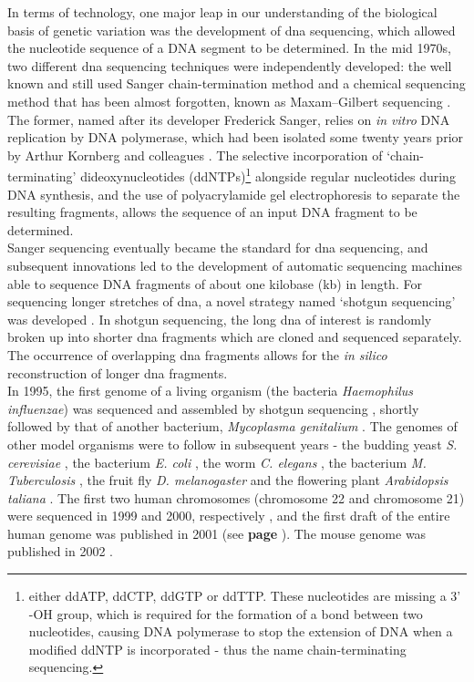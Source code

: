 In terms of technology, one major leap in our understanding of the biological basis of genetic variation was the development of \gls{dna} sequencing, which allowed the nucleotide sequence of a DNA segment to be determined.
In the mid 1970s, two different \gls{dna} sequencing techniques were independently developed: the well known and still used Sanger chain-termination method \cite{sanger1975rapid, sanger1977dna} and a chemical sequencing method that has been almost forgotten, known as Maxam–Gilbert sequencing \cite{maxam1977new}.
The former, named after its developer Frederick Sanger, relies on \textit{in vitro} DNA replication by DNA polymerase, which had been isolated some twenty years prior by Arthur Kornberg and colleagues \cite{kornberg1956enzymic}.
The selective incorporation of `chain-terminating' dideoxynucleotides (ddNTPs)\footnote{either ddATP, ddCTP, ddGTP or ddTTP.
These nucleotides are missing a 3' -OH group, which is required for the formation of a bond between two nucleotides, causing DNA polymerase to stop the extension of DNA when a modified ddNTP is incorporated - thus the name chain-terminating sequencing.} alongside regular nucleotides during DNA synthesis, and the use of polyacrylamide gel electrophoresis to separate the resulting fragments, allows the sequence of an input DNA fragment to be determined. \\

Sanger sequencing eventually became the standard for \gls{dna} sequencing, and subsequent innovations led to the development of automatic sequencing machines able to sequence DNA fragments of about one kilobase (kb) in length. 
For sequencing longer stretches of \gls{dna}, a novel strategy named `shotgun sequencing' was developed \cite{staden1979strategy, anderson1981shotgun}. 
In shotgun sequencing, the long \gls{dna} of interest is randomly broken up into shorter \gls{dna} fragments which are cloned and sequenced separately. 
The occurrence of overlapping \gls{dna} fragments allows for the \textit{in silico} reconstruction of longer \gls{dna} fragments. \\

In 1995, the first genome of a living organism (the bacteria \textit{Haemophilus influenzae}) was sequenced and assembled by shotgun sequencing \cite{fleischmann1995whole}, shortly followed by that of another bacterium, \textit{Mycoplasma genitalium} \cite{fraser1995minimal}. 
The genomes of other model organisms were to follow in subsequent years - the budding yeast \textit{S. cerevisiae} \cite{goffeau1996life}, the bacterium \textit{E. coli} \cite{blattner1997complete}, the worm \textit{C. elegans} \cite{c1998genome}, the bacterium \textit{M. Tuberculosis} \cite{cole1998deciphering}, the fruit fly \textit{D. melanogaster} \cite{adams2000genome} and the flowering plant \textit{Arabidopsis taliana} \cite{kaul2000analysis}.
The first two human chromosomes (chromosome 22 and chromosome 21) were sequenced in 1999 and 2000, respectively \cite{dunham1999dna, hattori2000dna}, and the first draft of the entire human genome was published in 2001 \cite{lander2001initial, venter2001sequence} (see \textbf{page \pageref{sec:hgp}}).
The mouse genome was published in 2002 \cite{waterston2002initial}.

